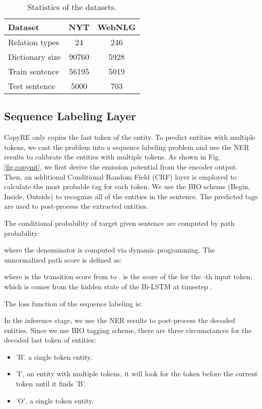 \documentclass[letterpaper]{article} \usepackage{aaai20}  \usepackage{times}  \usepackage{helvet} \usepackage{courier}  \usepackage[hyphens]{url}  \usepackage{graphicx}
\begin{document}
  \begin{table}[t]
    \centering
\begin{tabular}{lcc}
    \toprule
    Dataset & NYT &  WebNLG \\
    \midrule
    Relation types & 24 &  246 \\
    Dictionary size & 90760 &  5928 \\
    Train sentence & 56195 & 5019 \\
Test sentence & 5000 &  703 \\
\bottomrule
    \end{tabular}
\caption{Statistics of the datasets. }
    \label{tab:statistics}
    \end{table}
  \subsection{Sequence Labeling Layer}
  
  CopyRE only copies the last token of the entity. 
  To predict entities with multiple tokens, we cast the problem into a sequence labeling problem and use the NER results to calibrate the entities with multiple tokens. 
  As shown in Fig. \ref{fig:copymt}, we first derive the emission potential from the encoder output.
  Then, an additional Conditional Random Field (CRF) layer \cite{crf} is employed to calculate the most probable tag for each token.
We use the BIO scheme (Begin, Inside, Outside) to recognize all of the entities in the sentence. 
  The predicted tags are used to post-process the extracted entities. 
  
  The conditional probability of target  given sentence  are computed by path probability:
  
  
  where the denominator is computed via dynamic programming. The unnormalized path score is defined as: 
  
  
  where  is the transition score from  to .
   is the score of the  for the -th input token, which is comes from the hidden state of the Bi-LSTM at timestep .
  
  The loss function of the sequence labeling is:
  
  
  
  In the inference stage, we use the NER results to post-process the decoded entities. Since we use BIO tagging scheme, there are three circumstances for the decoded last token of entities:
  \begin{itemize}
    \item 'B'. a single token entity.
    \item 'I', an entity with multiple tokens, it will look for the token before the current token until it finds 'B'. 
    \item 'O', a single token entity.
  \end{itemize}
\end{document}
